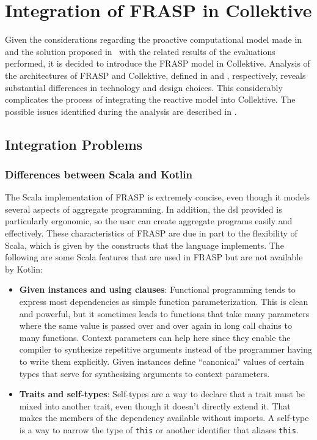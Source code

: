 \section{Integration of FRASP in Collektive}

Given the considerations regarding the proactive computational model made in  and the solution proposed in~\cite{Casadei2023} with the related results of the evaluations performed, it is decided to introduce the FRASP model in Collektive.
Analysis of the architectures of FRASP and Collektive, defined in  and , respectively, reveals substantial differences in technology and design choices. This considerably complicates the process of integrating the reactive model into Collektive. The possible issues identified during the analysis are described in .

\subsection{Integration Problems}
\label{subsection:integration-problems}

\subsubsection{Differences between Scala and Kotlin}
The Scala implementation of FRASP is extremely concise, even though it models several aspects of aggregate programming. In addition, the \ac{dsl} provided is particularly ergonomic, so the user can create aggregate programs easily and effectively. These characteristics of FRASP are due in part to the flexibility of Scala, which is given by the constructs that the language implements. The following are some Scala features that are used in FRASP but are not available by Kotlin:

\begin{itemize}
    \item \textbf{Given instances and using clauses}: Functional programming tends to express most dependencies as simple function parameterization. This is clean and powerful, but it sometimes leads to functions that take many parameters where the same value is passed over and over again in long call chains to many functions. Context parameters can help here since they enable the compiler to synthesize repetitive arguments instead of the programmer having to write them explicitly. Given instances define ``canonical" values of certain types that serve for synthesizing arguments to context parameters.
    \item \textbf{Traits and self-types}: Self-types are a way to declare that a trait must be mixed into another trait, even though it doesn't directly extend it. That makes the members of the dependency available without imports. A self-type is a way to narrow the type of \texttt{this} or another identifier that aliases \texttt{this}.
\end{itemize}

